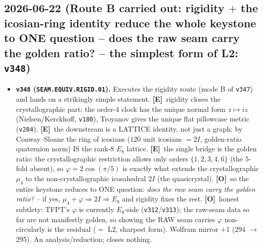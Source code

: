 \documentclass[11pt]{article}
\providecommand{\mE}{\textbf{[E]}}\providecommand{\mC}{\textbf{[C]}}
\providecommand{\mO}{\textbf{[O]}}\providecommand{\mX}{\textbf{[X]}}
\providecommand{\vref}[1]{\texttt{#1}}
\begin{document}
\subsection*{2026-06-22 (Route B carried out: rigidity $+$ the icosian-ring identity reduce the whole keystone to ONE question -- does the raw seam carry the golden ratio? -- the simplest form of L2: \texttt{v348})}
\begin{itemize}
\item \textbf{\texttt{v348} (\texttt{SEAM.EQUIV.RIGID.01}).} Executes the rigidity route (mode B of \vref{v347}) and
lands on a strikingly simple statement. \mE\ rigidity closes the crystallographic part: the order-4 clock has the
unique normal form $z\mapsto iz$ (Nielsen/Kerckhoff, \vref{v180}), Troyanov gives the unique flat pillowcase metric
(\vref{v284}). \mE\ the downstream is a LATTICE identity, not just a graph: by Conway--Sloane the ring of icosians
($120$ unit icosians $=2I$, golden-ratio quaternion norm) IS the rank-$8$ $E_8$ lattice. \mE\ the single bridge is
the golden ratio: the crystallographic restriction allows only orders $\{1,2,3,4,6\}$ (the $5$-fold absent), so
$\varphi=2\cos(\pi/5)$ is exactly what extends the crystallographic $\mu_4$ to the non-crystallographic icosahedral
$2I$ (the quasicrystal). \mO\ so the entire keystone reduces to ONE question: \emph{does the raw seam carry the
golden ratio?} -- if yes, $\mu_4{+}\varphi\Rightarrow2I\Rightarrow E_8$ and rigidity fixes the rest. \mO\ honest
subtlety: TFPT's $\varphi$ is currently $E_8$-side (\vref{v312}/\vref{v313}); the raw-seam data so far are not
manifestly golden, so showing the RAW seam carries $\varphi$ non-circularly is the residual ($=$ L2, sharpest form).
Wolfram mirror $+1$ (294 $\to$ 295). An analysis/reduction; closes nothing.
\end{itemize}
\end{document}
